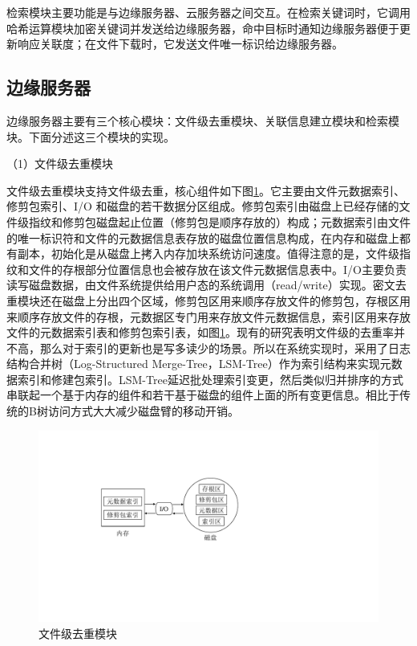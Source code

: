 \documentclass[promaster]{thesis-uestc}
\begin{document}
检索模块主要功能是与边缘服务器、云服务器之间交互。在检索关键词时，它调用哈希运算模块加密关键词并发送给边缘服务器，命中目标时通知边缘服务器便于更新响应关联度；在文件下载时，它发送文件唯一标识给边缘服务器。

\subsection{边缘服务器}

边缘服务器主要有三个核心模块：文件级去重模块、关联信息建立模块和检索模块。下面分述这三个模块的实现。

（1）文件级去重模块

文件级去重模块支持文件级去重，核心组件如下图\ref{边缘服务器的密文去重模块}。它主要由文件元数据索引、修剪包索引、I/O 和磁盘的若干数据分区组成。修剪包索引由磁盘上已经存储的文件级指纹和修剪包磁盘起止位置（修剪包是顺序存放的）构成；元数据索引由文件的唯一标识符和文件的元数据信息表存放的磁盘位置信息构成，在内存和磁盘上都有副本，初始化是从磁盘上拷入内存加块系统访问速度。值得注意的是，文件级指纹和文件的存根部分位置信息也会被存放在该文件元数据信息表中。I/O主要负责读写磁盘数据，由文件系统提供给用户态的系统调用（read/write）实现。密文去重模块还在磁盘上分出四个区域，修剪包区用来顺序存放文件的修剪包，存根区用来顺序存放文件的存根，元数据区专门用来存放文件元数据信息，索引区用来存放文件的元数据索引表和修剪包索引表，如图\ref{边缘服务器的密文去重模块}。现有的研究表明文件级的去重率并不高，那么对于索引的更新也是写多读少的场景。所以在系统实现时，采用了日志结构合并树（Log-Structured Merge-Tree，LSM-Tree）作为索引结构来实现元数据索引和修建包索引。LSM-Tree延迟批处理索引变更，然后类似归并排序的方式串联起一个基于内存的组件和若干基于磁盘的组件上面的所有变更信息。相比于传统的B树访问方式大大减少磁盘臂的移动开销。

\begin{figure}[htbp]
    \centering
    \includegraphics[width = 0.7\linewidth]{pic/边缘服务器的密文重删模块.pdf}
    \caption{文件级去重模块}
    \label{边缘服务器的密文去重模块}
\end{figure}
\end{document}
